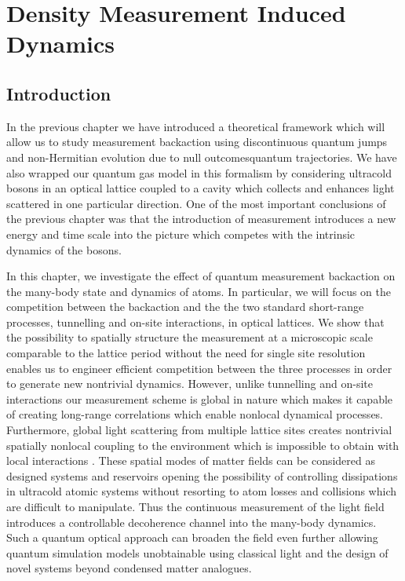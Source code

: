 
\chapter{Density Measurement Induced Dynamics}

\ifpdf
    \graphicspath{{Chapter5/Figs/Raster/}{Chapter5/Figs/PDF/}{Chapter5/Figs/}}
\else
    \graphicspath{{Chapter5/Figs/Vector/}{Chapter5/Figs/}}
\fi


\section{Introduction}

In the previous chapter we have introduced a theoretical framework
which will allow us to study measurement backaction using
discontinuous quantum jumps and non-Hermitian evolution due to null
outcomesquantum trajectories. We have also wrapped our quantum gas
model in this formalism by considering ultracold bosons in an optical
lattice coupled to a cavity which collects and enhances light
scattered in one particular direction. One of the most important
conclusions of the previous chapter was that the introduction of
measurement introduces a new energy and time scale into the picture
which competes with the intrinsic dynamics of the bosons.

In this chapter, we investigate the effect of quantum measurement
backaction on the many-body state and dynamics of atoms. In
particular, we will focus on the competition between the backaction
and the the two standard short-range processes, tunnelling and on-site
interactions, in optical lattices. We show that the possibility to
spatially structure the measurement at a microscopic scale comparable
to the lattice period without the need for single site resolution
enables us to engineer efficient competition between the three
processes in order to generate new nontrivial dynamics. However,
unlike tunnelling and on-site interactions our measurement scheme is
global in nature which makes it capable of creating long-range
correlations which enable nonlocal dynamical processes. Furthermore,
global light scattering from multiple lattice sites creates nontrivial
spatially nonlocal coupling to the environment which is impossible to
obtain with local interactions \cite{daley2014, diehl2008,
  syassen2008}. These spatial modes of matter fields can be considered
as designed systems and reservoirs opening the possibility of
controlling dissipations in ultracold atomic systems without resorting
to atom losses and collisions which are difficult to manipulate. Thus
the continuous measurement of the light field introduces a
controllable decoherence channel into the many-body dynamics. Such a
quantum optical approach can broaden the field even further allowing
quantum simulation models unobtainable using classical light and the
design of novel systems beyond condensed matter analogues.

